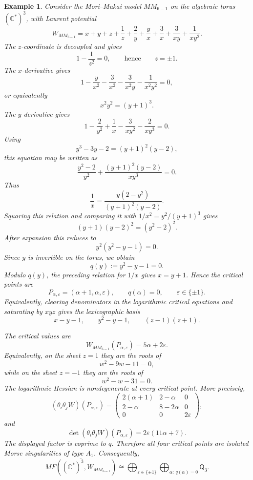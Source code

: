 \documentclass[11pt]{amsart}
\newtheorem{example}{Example}[section]
\newcommand{\MorseCat}[1]{\mathsf{Q}_{#1}}
\begin{document}
\begin{example}
Consider the Mori--Mukai model $MM_{6-1}$ on the algebraic torus
$(\mathbb{C}^*)^3$, with Laurent potential
\[
W_{MM_{6-1}}=x+y+z+\frac{1}{z}+\frac{2}{y}
+\frac{y}{x}+\frac{3}{x}+\frac{3}{xy}+\frac{1}{xy^2}.
\]
The $z$-coordinate is decoupled and gives
\[
1-\frac{1}{z^2}=0,
\qquad\text{hence}\qquad
z=\pm1.
\]
The $x$-derivative gives
\[
1-\frac{y}{x^2}-\frac{3}{x^2}-\frac{3}{x^2y}
-\frac{1}{x^2y^2}=0,
\]
or equivalently
\[
x^2y^2=(y+1)^3.
\]
The $y$-derivative gives
\[
1-\frac{2}{y^2}+\frac{1}{x}-\frac{3}{xy^2}-\frac{2}{xy^3}=0.
\]
Using
\[
y^3-3y-2=(y+1)^2(y-2),
\]
this equation may be written as
\[
\frac{y^2-2}{y^2}+\frac{(y+1)^2(y-2)}{xy^3}=0.
\]
Thus
\[
\frac{1}{x}=\frac{y(2-y^2)}{(y+1)^2(y-2)}.
\]
Squaring this relation and comparing it with
$1/x^2=y^2/(y+1)^3$ gives
\[
(y+1)(y-2)^2=(y^2-2)^2.
\]
After expansion this reduces to
\[
y^2(y^2-y-1)=0.
\]
Since $y$ is invertible on the torus, we obtain
\[
q(y):=y^2-y-1=0.
\]
Modulo $q(y)$, the preceding relation for $1/x$ gives $x=y+1$. Hence the
critical points are
\[
P_{\alpha,\varepsilon}=(\alpha+1,\alpha,\varepsilon),
\qquad
q(\alpha)=0,
\qquad
\varepsilon\in\{\pm1\}.
\]
Equivalently, clearing denominators in the logarithmic critical equations and
saturating by $xyz$ gives the lexicographic basis
\[
x-y-1,
\qquad
y^2-y-1,
\qquad
(z-1)(z+1).
\]

The critical values are
\[
W_{MM_{6-1}}(P_{\alpha,\varepsilon})=5\alpha+2\varepsilon.
\]
Equivalently, on the sheet $z=1$ they are the roots of
\[
w^2-9w-11=0,
\]
while on the sheet $z=-1$ they are the roots of
\[
w^2-w-31=0.
\]
The logarithmic Hessian is nondegenerate at every critical point. More
precisely,
\[
(\theta_i\theta_jW)(P_{\alpha,\varepsilon})=
\begin{pmatrix}
2(\alpha+1) & 2-\alpha & 0 \\
2-\alpha & 8-2\alpha & 0 \\
0 & 0 & 2\varepsilon
\end{pmatrix},
\]
and
\[
\det(\theta_i\theta_jW)(P_{\alpha,\varepsilon})
=2\varepsilon(11\alpha+7).
\]
The displayed factor is coprime to $q$. Therefore all four critical points are
isolated Morse singularities of type $A_1$. Consequently,
\[
\overline{MF((\mathbb{C}^*)^3,W_{MM_{6-1}})}
\cong \bigoplus_{\varepsilon\in\{\pm1\}} \bigoplus_{\alpha:\,q(\alpha)=0}\MorseCat{3}.
\]
\end{example}
\end{document}
